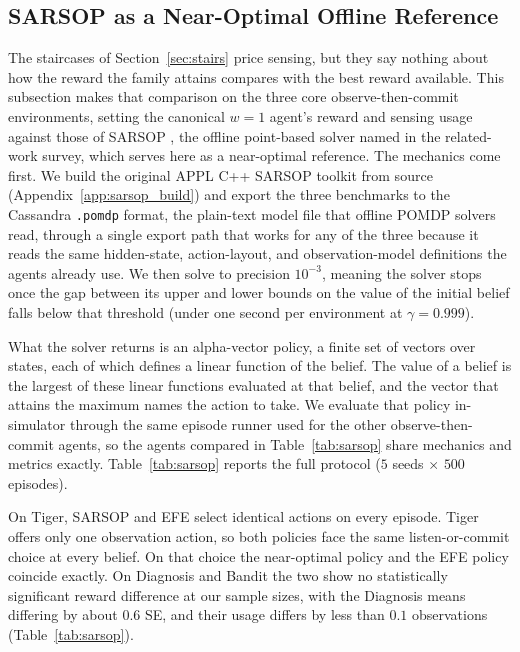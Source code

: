 \subsection{SARSOP as a Near-Optimal Offline Reference}
\label{app:sarsop_details}

The staircases of Section~\ref{sec:stairs} price sensing, but they say nothing about how the reward the family attains compares with the best reward available. This subsection makes that comparison on the three core observe-then-commit environments, setting the canonical $w{=}1$ agent's reward and sensing usage against those of SARSOP \citep{kurniawati2008}, the offline point-based solver named in the related-work survey, which serves here as a near-optimal reference. The mechanics come first. We build the original APPL C++ SARSOP toolkit from source (Appendix~\ref{app:sarsop_build}) and export the three benchmarks to the Cassandra \texttt{.pomdp} format, the plain-text model file that offline POMDP solvers read, through a single export path that works for any of the three because it reads the same hidden-state, action-layout, and observation-model definitions the agents already use. We then solve to precision $10^{-3}$, meaning the solver stops once the gap between its upper and lower bounds on the value of the initial belief falls below that threshold (under one second per environment at $\gamma{=}0.999$).

What the solver returns is an alpha-vector policy, a finite set of vectors over states, each of which defines a linear function of the belief. The value of a belief is the largest of these linear functions evaluated at that belief, and the vector that attains the maximum names the action to take. We evaluate that policy in-simulator through the same episode runner used for the other observe-then-commit agents, so the agents compared in Table~\ref{tab:sarsop} share mechanics and metrics exactly. Table~\ref{tab:sarsop} reports the full protocol ($5$ seeds $\times$ $500$ episodes).

On Tiger, SARSOP and EFE select identical actions on every episode. Tiger offers only one observation action, so both policies face the same listen-or-commit choice at every belief. On that choice the near-optimal policy and the EFE policy coincide exactly. On Diagnosis and Bandit the two show no statistically significant reward difference at our sample sizes, with the Diagnosis means differing by about $0.6$ SE, and their usage differs by less than $0.1$ observations (Table~\ref{tab:sarsop}).

